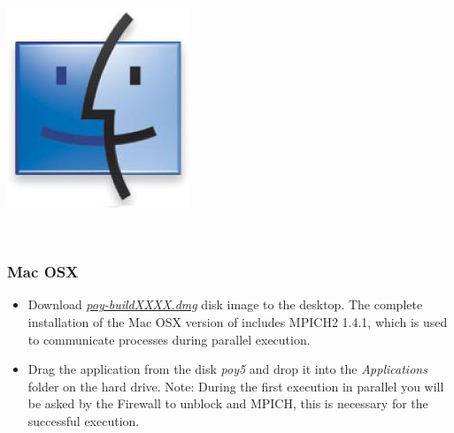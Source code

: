\begin{flushleft}
	\begin{minipage}[c]{0.074\textwidth}
   		\includegraphics[width=\textwidth]{doc/figures/figlogomac.jpg}
	\end{minipage}
	\,
	\begin{minipage}[t]{0.88\textwidth}
	   	\subsubsection*{Mac OSX}
	\end{minipage}
	            \begin{itemize}
			\item Download
            \href{http://research.amnh.org/scicomp/projects/poy.php}{\emph{poy-buildXXXX.dmg}} disk image 
             to the desktop. The complete installation of the Mac OSX version of \poy includes MPICH2 1.4.1, 
             which is used to communicate processes during parallel execution.
            		\item Drag the \poy application from the disk \emph{poy5} and drop it into the \emph{Applications}
            folder on the hard drive.  Note: During the first execution in parallel you will be asked by the Firewall to 
            unblock \poy and MPICH, this is necessary for the successful execution.
		\end{itemize}
 

\end{flushleft}
